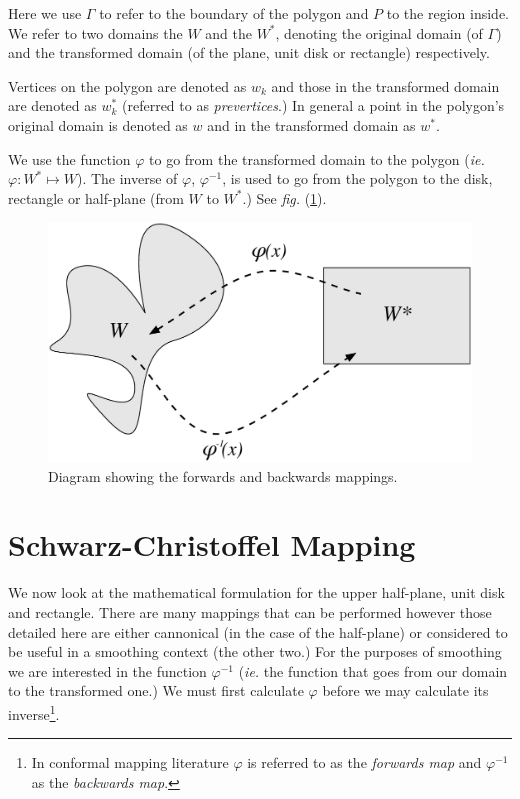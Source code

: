 \documentclass[a4paper,10pt]{amsart}
\newcommand{\sch}{Schwarz-Christoffel }
\newcommand{\fig}[1]{\emph{fig.} (\ref{#1})}
\renewcommand{\phi}{\varphi}
\begin{document}
Here we use $\Gamma$ to refer to the boundary of the polygon and $P$ to the region inside. We refer to two domains the $W$ and the $W^*$, denoting the original domain (of $\Gamma$) and the transformed domain (of the plane, unit disk or rectangle) respectively. 

Vertices on the polygon are denoted as $w_k$ and those in the transformed domain are denoted as $w^*_k$ (referred to as \emph{prevertices}.) In general a point in the polygon's original domain is denoted as $w$ and in the transformed domain as $w^*$.

We use the function $\phi$ to go from the transformed domain to the polygon (\emph{ie.} $\phi:W^* \mapsto W$). The inverse of $\phi$, $\phi^{-1}$, is used to go from the polygon to the disk, rectangle or half-plane (from $W$ to $W^*$.)  See \fig{mappingdia}.

\begin{figure} [tbp]
\centering
\includegraphics[scale=0.5]{figs/mappingdia.pdf}
\caption{Diagram showing the forwards and backwards mappings.}
\label{mappingdia}
\end{figure}


\section{\sch Mapping}

We now look at the mathematical formulation for the upper half-plane, unit disk and rectangle. There are many mappings that can be performed however those detailed here are either cannonical (in the case of the half-plane) or considered to be useful in a smoothing context (the other two.) For the purposes of smoothing we are interested in the function $\phi^{-1}$ (\emph{ie.} the function that goes from our domain to the transformed one.) We must first calculate $\phi$ before we may calculate its inverse\footnote{In conformal mapping literature $\phi$ is referred to as the \emph{forwards map} and $\phi^{-1}$ as the \emph{backwards map}.}.
\end{document}
